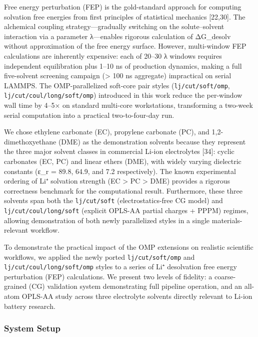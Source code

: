 \documentclass[
  11pt,
]{article}
\begin{document}
Free energy perturbation (FEP) is the gold-standard approach for
computing solvation free energies from first principles of statistical
mechanics {[}22,30{]}. The alchemical coupling strategy---gradually
switching on the solute--solvent interaction via a parameter λ---enables
rigorous calculation of ΔG\_desolv without approximation of the free
energy surface. However, multi-window FEP calculations are inherently
expensive: each of 20--30 λ windows requires independent equilibration
plus 1--10 ns of production dynamics, making a full five-solvent
screening campaign (\textgreater{} 100 ns aggregate) impractical on
serial LAMMPS. The OMP-parallelized soft-core pair styles
(\texttt{lj/cut/soft/omp}, \texttt{lj/cut/coul/long/soft/omp})
introduced in this work reduce the per-window wall time by 4--5× on
standard multi-core workstations, transforming a two-week serial
computation into a practical two-to-four-day run.

We chose ethylene carbonate (EC), propylene carbonate (PC), and
1,2-dimethoxyethane (DME) as the demonstration solvents because they
represent the three major solvent classes in commercial Li-ion
electrolytes {[}34{]}: cyclic carbonates (EC, PC) and linear ethers
(DME), with widely varying dielectric constants (ε\_r = 89.8, 64.9, and
7.2 respectively). The known experimental ordering of Li⁺ solvation
strength (EC \textgreater{} PC \textgreater{} DME) provides a rigorous
correctness benchmark for the computational result. Furthermore, these
three solvents span both the \texttt{lj/cut/soft} (electrostatics-free
CG model) and \texttt{lj/cut/coul/long/soft} (explicit OPLS-AA partial
charges + PPPM) regimes, allowing demonstration of both newly
parallelized styles in a single materials-relevant workflow.

To demonstrate the practical impact of the OMP extensions on realistic
scientific workflows, we applied the newly ported
\texttt{lj/cut/soft/omp} and \texttt{lj/cut/coul/long/soft/omp} styles
to a series of Li⁺ desolvation free energy perturbation (FEP)
calculations. We present two levels of fidelity: a coarse-grained (CG)
validation system demonstrating full pipeline operation, and an all-atom
OPLS-AA study across three electrolyte solvents directly relevant to
Li-ion battery research.

\subsubsection{System Setup}\label{system-setup}
\end{document}
